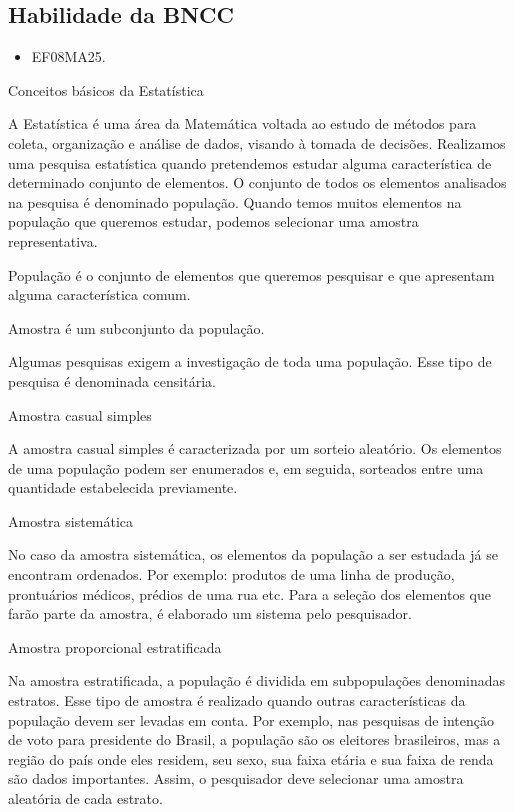 \subsection{Habilidade da BNCC}

\begin{itemize}
\item EF08MA25.
\end{itemize}

Conceitos básicos da Estatística

A Estatística é uma área da Matemática voltada ao estudo de métodos para
coleta, organização e análise de dados, visando à tomada de decisões.
Realizamos uma pesquisa estatística quando pretendemos estudar alguma
característica de determinado conjunto de elementos. O conjunto de todos
os elementos analisados na pesquisa é denominado população. Quando temos
muitos elementos na população que queremos estudar, podemos selecionar
uma amostra representativa.

População é o conjunto de elementos que queremos pesquisar e que
apresentam alguma característica comum.

Amostra é um subconjunto da população.

Algumas pesquisas exigem a investigação de toda uma população. Esse tipo
de pesquisa é denominada censitária.

Amostra casual simples

A amostra casual simples é caracterizada por um sorteio aleatório. Os
elementos de uma população podem ser enumerados e, em seguida, sorteados
entre uma quantidade estabelecida previamente.

Amostra sistemática

No caso da amostra sistemática, os elementos da população a ser estudada
já se encontram ordenados. Por exemplo: produtos de uma linha de
produção, prontuários médicos, prédios de uma rua etc. Para a seleção
dos elementos que farão parte da amostra, é elaborado um sistema pelo
pesquisador.

Amostra proporcional estratificada

Na amostra estratificada, a população é dividida em subpopulações
denominadas estratos. Esse tipo de amostra é realizado quando outras
características da população devem ser levadas em conta. Por exemplo,
nas pesquisas de intenção de voto para presidente do Brasil, a população
são os eleitores brasileiros, mas a região do país onde eles residem,
seu sexo, sua faixa etária e sua faixa de renda são dados importantes.
Assim, o pesquisador deve selecionar uma amostra aleatória de cada
estrato.

